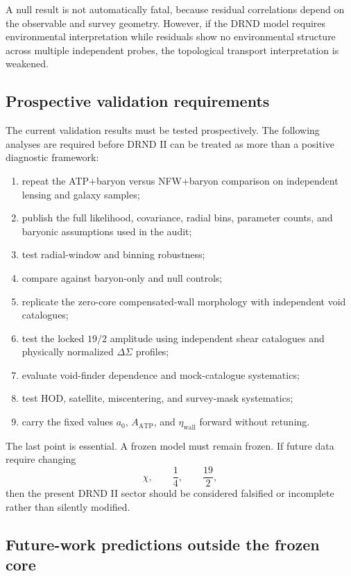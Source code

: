\documentclass[12pt]{iopart}
\begin{document}
A null result is not automatically fatal, because residual correlations depend on the observable and survey geometry. However, if the DRND model requires environmental interpretation while residuals show no environmental structure across multiple independent probes, the topological transport interpretation is weakened.

\subsection{Prospective validation requirements}

The current validation results must be tested prospectively. The following analyses are required before DRND II can be treated as more than a positive diagnostic framework:
\begin{enumerate}
    \item repeat the ATP+baryon versus NFW+baryon comparison on independent lensing and galaxy samples;
    \item publish the full likelihood, covariance, radial bins, parameter counts, and baryonic assumptions used in the audit;
    \item test radial-window and binning robustness;
    \item compare against baryon-only and null controls;
    \item replicate the zero-core compensated-wall morphology with independent void catalogues;
    \item test the locked \(19/2\) amplitude using independent shear catalogues and physically normalized \(\Delta\Sigma\) profiles;
    \item evaluate void-finder dependence and mock-catalogue systematics;
    \item test HOD, satellite, miscentering, and survey-mask systematics;
    \item carry the fixed values \(a_0\), \(A_{\mathrm{ATP}}\), and \(\eta_{\mathrm{wall}}\) forward without retuning.
\end{enumerate}

The last point is essential. A frozen model must remain frozen. If future data require changing
\begin{equation}
\chi,\qquad
\frac14,\qquad
\frac{19}{2},
\end{equation}
then the present DRND II sector should be considered falsified or incomplete rather than silently modified.

\subsection{Future-work predictions outside the frozen core}
\end{document}
